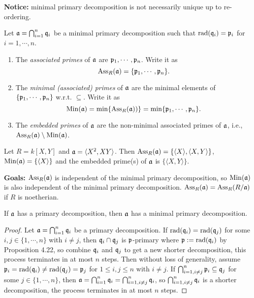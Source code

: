 \noindent \textbf{Notice:} minimal primary decomposition is not necessarily unique up to re-ordering.

\begin{definition}
    Let $\mathfrak{a} = \bigcap_{i=1}^{n} \mathfrak{q}_i$ be a minimal primary decomposition such that $\operatorname{rad}(\mathfrak{q}_i) = \mathfrak{p}_i$ for $i = 1,\cdots,n$.
    \begin{enumerate}
        \item The \emph{associated primes} of $\mathfrak{a}$ are $\mathfrak{p}_1,\cdots,\mathfrak{p}_n$. Write it as 
            \[\operatorname{Ass}_R(\mathfrak{a}) = \{\mathfrak{p}_1,\cdots,\mathfrak{p}_n\}.\]
        \item The \emph{minimal (associated) primes} of $\mathfrak{a}$ are the minimal elements of $\{\mathfrak{p}_1,\cdots,\mathfrak{p}_n\}$ w.r.t. $\subseteq$. Write it as 
            \[\operatorname{Min}(\mathfrak{a}) = \min\{\operatorname{Ass}_R(\mathfrak{a}))\} = \min\{\mathfrak{p}_1,\cdots,\mathfrak{p}_n\}.\]
    \item The \emph{embedded primes} of $\mathfrak{a}$ are the non-minimal associated primes of $\mathfrak{a}$, i.e., $\operatorname{Ass}_R(\mathfrak{a}) \setminus \operatorname{Min}(\mathfrak{a})$.
    \end{enumerate}
\end{definition}

\begin{example}
    Let $R = k[X,Y]$ and $\mathfrak{a} = \langle X^{2},XY \rangle$. Then $\operatorname{Ass}_R(\mathfrak{a}) = \{\langle X \rangle, \langle X,Y \rangle\}$, $\operatorname{Min}(\mathfrak{a}) = \{\langle X \rangle\}$ and the embedded prime(s) of $\mathfrak{a}$ is $\{\langle X,Y \rangle\}$.
\end{example}

\noindent \textbf{Goals:} $\operatorname{Ass}_R(\mathfrak{a})$ is independent of the minimal primary decomposition, so $\operatorname{Min}(\mathfrak{a})$ is also independent of the minimal primary decomposition. $\operatorname{Ass}_R(\mathfrak{a}) = \operatorname{Ass}_R(R/\mathfrak{a})$ if $R$ is noetherian.

\begin{proposition}
    If $\mathfrak{a}$ has a primary decomposition, then $\mathfrak{a}$ has a minimal primary decomposition.
\end{proposition}

\begin{proof}
    Let $\mathfrak{a} = \bigcap_{i=1}^{n} \mathfrak{q}_i$ be a primary decomposition. If $\operatorname{rad}(\mathfrak{q}_i) = \operatorname{rad}(\mathfrak{q}_j)$ for some $i,j \in \{1,\cdots,n\}$ with $i \neq j$, then $\mathfrak{q}_i \cap \mathfrak{q}_j$ is $\mathfrak{p}$-primary where $\mathfrak{p} := \operatorname{rad}(\mathfrak{q}_i)$ by Proposition 4.22, so combine $\mathfrak{q}_i$ and $\mathfrak{q}_j$ to get a new shorter decomposition, this process terminates in at most $n$ steps. Then without loss of generality, assume $\mathfrak{p}_i = \operatorname{rad}(\mathfrak{q}_i) \neq \operatorname{rad}(\mathfrak{q}_j) = \mathfrak{p}_j$ for $1 \leq i,j \leq n$ with $i \neq j$. If $\bigcap_{i=1,i\neq j}^{n} \mathfrak{p}_i \subseteq \mathfrak{q}_j$ for some $j \in \{1,\cdots,n\}$, then $\mathfrak{a} = \bigcap_{i=1}^{n} \mathfrak{q}_i = \bigcap_{i=1,i \neq j}^{n} \mathfrak{q}_i$, so $\bigcap_{i=1,i \neq j}^{n} \mathfrak{q}_i$ is a shorter decomposition, the process terminates in at most $n$ steps.
\end{proof}

